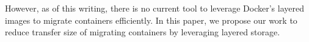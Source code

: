 However, as of this writing, there is no current tool to leverage Docker's layered images to migrate containers efficiently. In this paper, we propose our work to reduce transfer size of migrating containers by leveraging layered storage.
